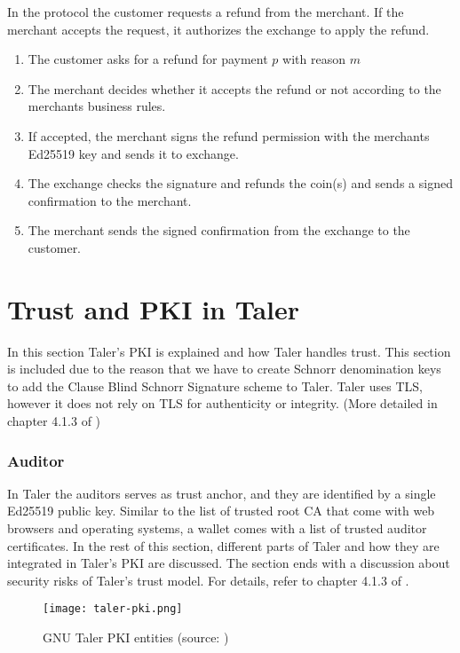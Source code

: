 In the protocol the customer requests a refund from the merchant.
If the merchant accepts the request, it authorizes the exchange to apply the refund.
\begin{enumerate}
    \item The customer asks for a refund for payment $p$ with reason $m$
    \item The merchant decides whether it accepts the refund or not according to the merchants business rules.
    \item If accepted, the merchant signs the refund permission with the merchants Ed25519 key and sends it to exchange.
    \item The exchange checks the signature and refunds the coin(s) and sends a signed confirmation to the merchant.
    \item The merchant sends the signed confirmation from the exchange to the customer.
\end{enumerate}

\section{Trust and PKI in Taler}
In this section Taler's \ac{PKI} is explained and how Taler handles trust.
This section is included due to the reason that we have to create Schnorr denomination keys to add the Clause Blind Schnorr Signature scheme to Taler.
Taler uses TLS, however it does not rely on TLS for authenticity or integrity. (More detailed in chapter 4.1.3 of \cite{dold:the-gnu-taler-system})

\subsubsection{Auditor}
In Taler the auditors serves as trust anchor, and they are identified by a single Ed25519 public key.
Similar to the list of trusted root \ac{CA} that come with web browsers and operating systems, a wallet comes with a list of trusted auditor certificates.
In the rest of this section, different parts of Taler and how they are integrated in Taler's \ac{PKI} are discussed.
The section ends with a discussion about security risks of Taler's trust model.
For details, refer to chapter 4.1.3 of \cite{dold:the-gnu-taler-system}.

\begin{figure}[htp]
    \texttt{[image: taler-pki.png]}
    \centering
    \caption{GNU Taler PKI entities (source: \cite{dold:the-gnu-taler-system})}
    \label{fig:taler-pki}
\end{figure}

